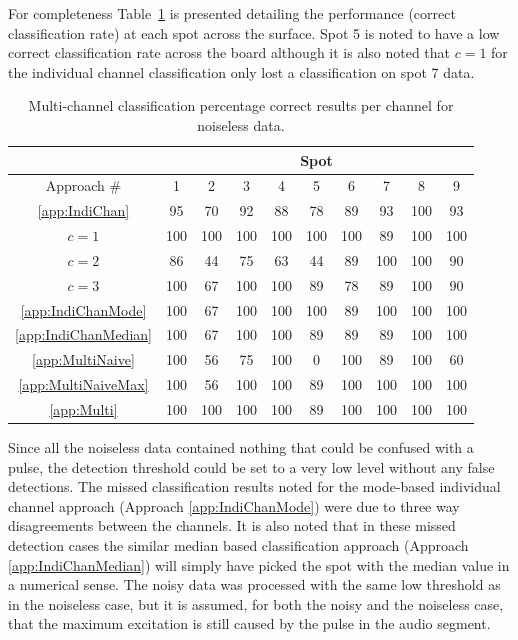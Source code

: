For completeness Table~\ref{tab:multiAPRresultsPerChan} is presented detailing the performance (correct classification rate) at each spot across the surface. Spot 5 is noted to have a low correct classification rate across the board although it is also noted that $c = 1$ for the individual channel classification only lost a classification on spot 7 data.

\begin{table}\begin{center}
\caption{Multi-channel classification percentage correct results per channel for noiseless data.}
\label{tab:multiAPRresultsPerChan}
\begin{tabular}{|c|c|c|c|c|c|c|c|c|c|}\hline
  & \multicolumn{9}{|c|}{Spot} \\
\hline
Approach \#             & 1   & 2   & 3   & 4   & 5   & 6   & 7    & 8    & 9  \\ \hline \ref{app:IndiChan}      & 95  & 70  & 92  & 88  & 78  & 89  &  93  & 100  & 93   \\
$c = 1$                 & 100 & 100 & 100 & 100 & 100 & 100 &   89 &  100 & 100  \\
$c = 2$                 & 86  & 44  & 75  & 63  & 44  & 89  & 100  & 100  & 90   \\
$c = 3$                 & 100 &  67 & 100 & 100 &  89 &  78 &   89 &  100 &  90  \\
\ref{app:IndiChanMode}  & 100 &  67 & 100 & 100 & 100 &  89 &  100 &  100 & 100  \\
\ref{app:IndiChanMedian}& 100 &  67 & 100 & 100 &  89 &  89 &   89 &  100 & 100  \\
\ref{app:MultiNaive}    & 100 &  56 &  75 & 100 &   0 & 100 &   89 &  100 &  60  \\
\ref{app:MultiNaiveMax} & 100 &  56 & 100 & 100 &  89 & 100 &  100 &  100 & 100  \\
\ref{app:Multi}         & 100 & 100 & 100 & 100 &  89 & 100 &  100 &  100 & 100  \\ \hline
\end{tabular}\end{center}\end{table}


Since all the noiseless data contained nothing that could be confused with a pulse, the detection threshold could be set to a very low level without any false detections. The missed classification results noted for the mode-based individual channel approach (Approach \ref{app:IndiChanMode}) were due to three way disagreements between the channels. It is also noted that in these missed detection cases the similar median based classification approach (Approach \ref{app:IndiChanMedian}) will simply have picked the spot with the median value in a numerical sense. The noisy data was processed with the same low threshold as in the noiseless case, but it is assumed, for both the noisy and the noiseless case, that the maximum excitation is still caused by the pulse in the audio segment.

